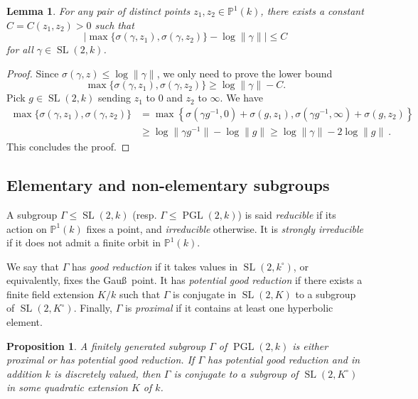 \documentclass[10pt]{amsart}
\newtheorem{lemm}[theo]{Lemma}\newtheorem{prop}[theo]{Proposition}\newtheorem{coro}[theo]{Corollary}\newtheorem{conj}[theo]{Conjecture}
\theoremstyle{definition}\newtheorem{defi}[theo]{Definition}\newtheorem{rema}[theo]{Remark}\newtheorem{exam}[theo]{Example}\newtheorem{exem}[theo]{Example}\newtheorem{nota}[theo]{Notation}
\DeclareMathOperator{\SL}{SL}
\DeclareMathOperator{\PGL}{PGL}
\newcommand{\PP}{\mathbb{P}}
\newcommand{\SLk}{\SL(2,k)}
\newcommand{\PGLk}{\PGL(2, k)}
\begin{document}
\begin{lemm}\label{lem:two points}
For any pair of distinct points $z_1, z_2 \in \PP^1(k)$, there exists a constant $C = C(z_1, z_2)>0$ such that
\[
\left| \max \{ \sigma(\gamma, z_1), \sigma(\gamma, z_2)\} - \log \| \gamma \| \right|
\le C
\]
for all $\gamma\in \SL(2,k)$.
\end{lemm}
\begin{proof}
Since $ \sigma(\gamma, z) \le \log \| \gamma\|$, we only need to prove the lower bound
\[
\max \{ \sigma(\gamma, z_1), \sigma(\gamma, z_2)\} \ge \log \| \gamma \| -C.
\]
Pick $g\in \SLk$ sending $z_1$ to $0$ and $z_2$ to $\infty$. We have
\begin{align*}
\max \{ \sigma(\gamma, z_1), \sigma(\gamma, z_2)\} &=
\max \left\{ \sigma(\gamma g^{-1}, 0) + \sigma (g,z_1), \sigma(\gamma g^{-1}, \infty) + \sigma (g,z_2)\right\}\\
&\ge \log \| \gamma g^{-1}\| -\log \| g \| \ge \log \| \gamma\| - 2\log \| g \|~.
\end{align*}
This concludes the proof.
\end{proof}



\subsection{Elementary and non-elementary subgroups} \label{subs:elementary}

A subgroup $\Gamma\leq \SLk$ (resp. $\Gamma \leq \PGLk$) is said \emph{reducible} if its action on $\PP^1(k)$ fixes a point, and \emph{irreducible} otherwise. It is \emph{strongly irreducible} if it does not admit a finite orbit in $\PP^1(k)$.

We say that $\Gamma$ has \emph{good reduction} if it takes values in $\SL(2,k^\circ)$, or equivalently, fixes the Gau\ss~point. It has \emph{potential good reduction} if there exists a finite field extension $K/k$ such that $\Gamma$ is conjugate in $\SL(2,K)$ to a subgroup of $\SL(2,K^\circ)$. Finally, $\Gamma$ is \emph{proximal } if it contains at least one hyperbolic element.

\begin{prop}\label{prop:fixed point}
A finitely generated subgroup $\Gamma$ of $\PGLk$ is either proximal or has potential good reduction. If $\Gamma$ has potential good reduction and in addition $k$ is discretely valued, then $\Gamma$ is conjugate to a subgroup of $\SL(2,K^\circ)$ in some quadratic extension $K$ of $k$.
\end{prop}
\end{document}
